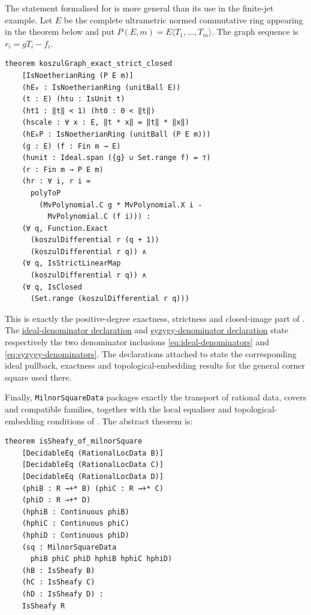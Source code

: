 \documentclass[11pt,reqno]{amsart}
\theoremstyle{definition}
\begin{document}
The statement formalised for  is more general than its use in
the finite-jet example.  Let \(E\) be the complete ultrametric normed
commutative ring appearing in the theorem below and put
\(P(E,m)=E\langle T_1,\ldots,T_m\rangle\).  The graph sequence is
\(r_i=gT_i-f_i\).

\begin{lstlisting}
theorem koszulGraph_exact_strict_closed
    [IsNoetherianRing (P E m)]
    (hE₀ : IsNoetherianRing (unitBall E))
    (t : E) (htu : IsUnit t)
    (ht1 : ‖t‖ < 1) (ht0 : 0 < ‖t‖)
    (hscale : ∀ x : E, ‖t * x‖ = ‖t‖ * ‖x‖)
    (hE₀P : IsNoetherianRing (unitBall (P E m)))
    (g : E) (f : Fin m → E)
    (hunit : Ideal.span ({g} ∪ Set.range f) = ⊤)
    (r : Fin m → P E m)
    (hr : ∀ i, r i =
      polyToP
        (MvPolynomial.C g * MvPolynomial.X i -
          MvPolynomial.C (f i))) :
    (∀ q, Function.Exact
      (koszulDifferential r (q + 1))
      (koszulDifferential r q)) ∧
    (∀ q, IsStrictLinearMap
      (koszulDifferential r q)) ∧
    (∀ q, IsClosed
      (Set.range (koszulDifferential r q)))
\end{lstlisting}

This is exactly the positive-degree exactness, strictness and closed-image
part of .  The
\href{https://cbirkbeck.github.io/uniform-sheafy-tate-domains/lean/AdicSpaces/declarations/FiniteJet.GraphKoszul.pow_smul_graphIdeal_inter_unitBall_subset.html}{ideal-denominator declaration}
and
\href{https://cbirkbeck.github.io/uniform-sheafy-tate-domains/lean/AdicSpaces/declarations/FiniteJet.GraphKoszul.pow_smul_ker_d1_inter_subset.html}{syzygy-denominator declaration}
state respectively the two denominator inclusions
\eqref{eq:ideal-denominators} and \eqref{eq:syzygy-denominators}.
The declarations attached to
state the corresponding ideal pullback, exactness and topological-embedding
results for the general corner square used there.

Finally, \texttt{MilnorSquareData} packages exactly the transport of rational
data, covers and compatible families, together with the local equaliser and
topological-embedding conditions of .  The
abstract theorem is:

\begin{lstlisting}
theorem isSheafy_of_milnorSquare
    [DecidableEq (RationalLocData B)]
    [DecidableEq (RationalLocData C)]
    [DecidableEq (RationalLocData D)]
    (phiB : R →+* B) (phiC : R →+* C)
    (phiD : R →+* D)
    (hphiB : Continuous phiB)
    (hphiC : Continuous phiC)
    (hphiD : Continuous phiD)
    (sq : MilnorSquareData
      phiB phiC phiD hphiB hphiC hphiD)
    (hB : IsSheafy B)
    (hC : IsSheafy C)
    (hD : IsSheafy D) :
    IsSheafy R
\end{lstlisting}
\end{document}
